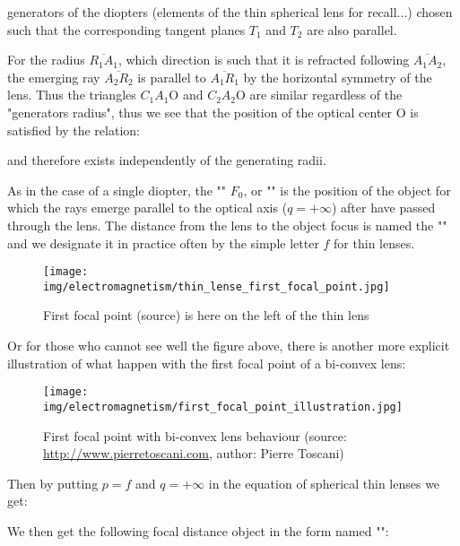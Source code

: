 	generators of the diopters (elements of the thin spherical lens for recall...) chosen such that the corresponding tangent planes $T_1$ and $T_2$ are also parallel.

	For the radius $\overline{R_1A_1}$, which direction is such that it is refracted following $\overline{A_1A_2}$, the emerging ray $\overline{A_2R_2}$ is parallel to $\overline{A_1R_1}$ by the horizontal symmetry of the lens. Thus the triangles $C_1A_1\text{O}$ and $C_2A_2\text{O}$ are similar regardless of the "generators radius", thus we see that the position of the optical center O is satisfied by the relation:
	
	and therefore exists independently of the generating radii.
	
	As in the case of a single diopter, the "" $F_0$, or "" is the position of the object for which the rays emerge parallel to the optical axis ($q=+\infty$) after have passed through the lens. The distance from the lens to the object focus is named the "" and we designate it in practice often by the simple letter $f$ for thin lenses.
	\begin{figure}[H]
		\centering
		\texttt{[image: img/electromagnetism/thin\_lense\_first\_focal\_point.jpg]}
		\caption{First focal point (source) is here on the left of the thin lens}
	\end{figure}
	Or for those who cannot see well the figure above, there is another more explicit illustration of what happen with the first focal point of a bi-convex lens:
	\begin{figure}[H]
		\centering
		\texttt{[image: img/electromagnetism/first\_focal\_point\_illustration.jpg]}
		\caption[First focal point with bi-convex lens behaviour]{First focal point with bi-convex lens behaviour (source: \url{http://www.pierretoscani.com}, author: Pierre Toscani)}
	\end{figure}
	Then by putting $p=f$ and $q=+\infty$ in the equation of spherical thin lenses we get:
	
	We then get the following focal distance object in the form named "":
	
